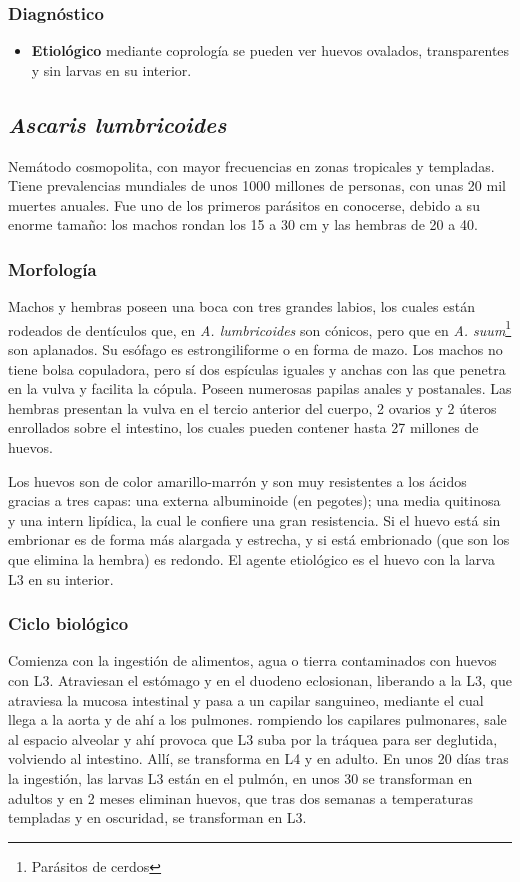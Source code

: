 \subsubsection{Diagnóstico}
\begin{itemize}[itemsep=0pt,parsep=0pt,topsep=0pt,partopsep=0pt]
	\item\textbf{Etiológico} mediante coprología se pueden ver huevos ovalados, transparentes y sin larvas en su interior.
\end{itemize}
\newpage
\subsection{\textit{Ascaris lumbricoides}}
Nemátodo cosmopolita, con mayor frecuencias en zonas tropicales y templadas. Tiene prevalencias mundiales de unos 1000 millones de personas, con unas 20 mil muertes anuales. Fue uno de los primeros parásitos en conocerse, debido a su enorme tamaño: los machos rondan los 15 a 30 cm y las hembras de 20 a 40.
\subsubsection{Morfología}
Machos y hembras poseen una boca con tres grandes labios, los cuales están rodeados de dentículos que, en \textit{A. lumbricoides} son cónicos, pero que en \textit{A. suum}\footnote{Parásitos de cerdos} son aplanados. Su esófago es estrongiliforme o en forma de mazo. Los machos no tiene bolsa copuladora, pero sí dos espículas iguales y anchas con las que penetra en la vulva y facilita la cópula. Poseen numerosas papilas anales y postanales. Las hembras presentan la vulva en el tercio anterior del cuerpo, 2 ovarios y 2 úteros enrollados sobre el intestino, los cuales pueden contener hasta 27 millones de huevos.

Los huevos son de color amarillo-marrón y son muy resistentes a los ácidos gracias a tres capas: una externa albuminoide (en pegotes); una media quitinosa y una intern lipídica, la cual le confiere una gran resistencia. Si el huevo está sin embrionar es de forma más alargada y estrecha, y si está embrionado (que son los que elimina la hembra) es redondo. El agente etiológico es el huevo con la larva L3 en su interior.
\subsubsection{Ciclo biológico}
Comienza con la ingestión de alimentos, agua o tierra contaminados con huevos con L3. Atraviesan el estómago y en el duodeno eclosionan, liberando a la L3, que atraviesa la mucosa intestinal y pasa a un capilar sanguineo, mediante el cual llega a la aorta y de ahí a los pulmones. rompiendo los capilares pulmonares, sale al espacio alveolar y ahí provoca que L3 suba por la tráquea para ser deglutida, volviendo al intestino. Allí, se transforma en L4 y en adulto. En unos 20 días tras la ingestión, las larvas L3 están en el pulmón, en unos 30 se transforman en adultos y en 2 meses eliminan huevos, que tras dos semanas a temperaturas templadas y en oscuridad, se transforman en L3.
